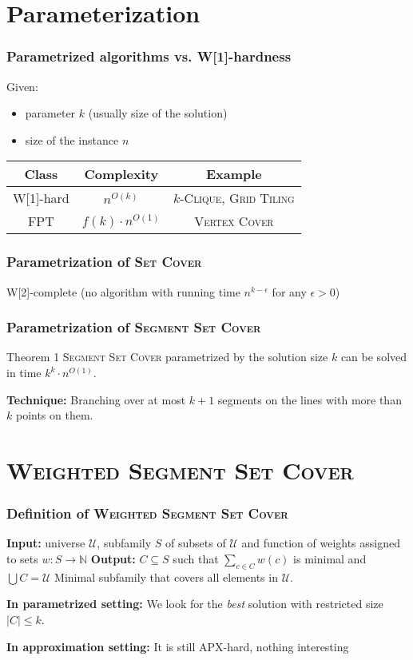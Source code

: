 \documentclass{beamer}
\begin{document}
\section{Parameterization}

\begin{frame}
\frametitle{Parametrized algorithms vs. W[1]-hardness}
Given:
\begin{itemize}
\item parameter $k$ (usually size of the solution)
\item size of the instance $n$
\end{itemize}
\bigskip

\begin{tabular}{|c|c|c|}
\hline
\textbf{Class} & \textbf{Complexity} & \textbf{Example}\\
\hline
W[1]-hard & $n^{O(k)}$ & \textsc{$k$-Clique}, \textsc{Grid Tiling}\\
\hline
FPT & $f(k) \cdot n^{O(1)}$ & \textsc{Vertex Cover}\\
\hline
\end{tabular}

\end{frame}

\begin{frame}
\frametitle{Parametrization of \textsc{Set Cover}}
W[2]-complete (no algorithm with running time $n^{k-\epsilon}$ for any $\epsilon > 0$)
\end{frame}

\begin{frame}
\frametitle{Parametrization of \textsc{Segment Set Cover}}
\begin{block}{Theorem 1}
	\textsc{Segment Set Cover} parametrized by the solution size $k$
	can be solved in time $k^k \cdot n^{O(1)}$.
\end{block}

\textbf{Technique:} Branching over at most $k+1$
segments on the lines with more than $k$ points on them.
\end{frame}

\section{\textsc{Weighted Segment Set Cover}} 

\begin{frame}
\frametitle{Definition of \textsc{Weighted Segment Set Cover}}

\textbf{Input:} universe $\mathcal{U}$,
subfamily $S$ of subsets of $\mathcal{U}$
and function of weights assigned to sets $w : S \rightarrow \mathbb{N}$
\newline
\textbf{Output:} $C \subseteq S$ such that $\sum_{c \in C} w(c)$ is minimal and
$\bigcup C = \mathcal{U}$
\newline
Minimal subfamily that covers all elements in $\mathcal{U}$.

\bigskip
\textbf{In parametrized setting:}
We look for the \textit{best} solution with restricted size $|C| \le k$.

\textbf{In approximation setting:}
It is still APX-hard, nothing interesting


\end{frame}
\end{document}
